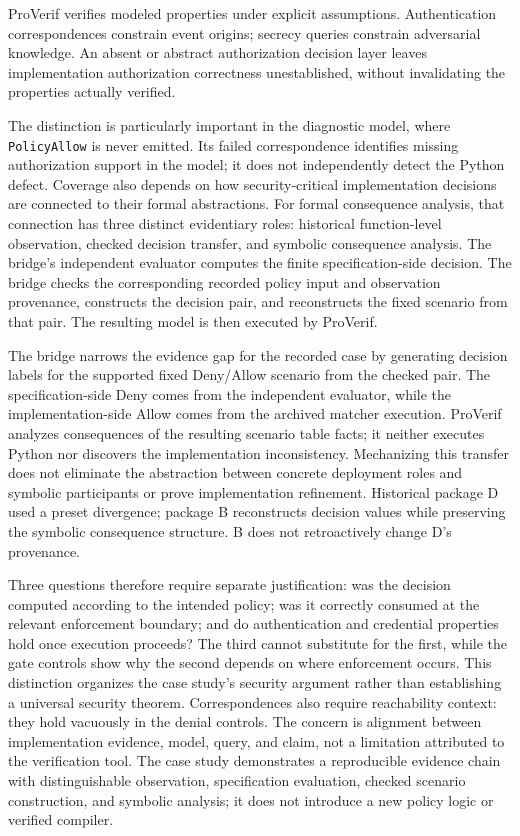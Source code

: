 ProVerif verifies modeled properties under explicit assumptions.
Authentication correspondences constrain event origins; secrecy queries
constrain adversarial knowledge. An absent or abstract authorization decision
layer leaves implementation authorization correctness unestablished, without
invalidating the properties actually verified.

The distinction is particularly important in the diagnostic model, where
\texttt{PolicyAllow} is never emitted. Its failed correspondence identifies
missing authorization support in the model; it does not independently detect
the Python defect. Coverage also depends on how security-critical
implementation decisions are connected to their formal abstractions.
For formal consequence analysis, that connection has three distinct evidentiary roles:
historical function-level observation, checked decision transfer, and
symbolic consequence analysis. The bridge's independent evaluator computes
the finite specification-side decision. The bridge checks the corresponding
recorded policy input and observation provenance, constructs the decision
pair, and reconstructs the fixed scenario from that pair. The resulting model is then
executed by ProVerif.

The bridge narrows the evidence gap for the recorded case by generating
decision labels for the supported fixed Deny/Allow scenario from the checked
pair. The specification-side Deny comes from the
independent evaluator, while the implementation-side Allow comes from the
archived matcher execution. ProVerif analyzes consequences of the resulting
scenario table facts; it neither executes Python nor discovers the implementation
inconsistency. Mechanizing this transfer does not eliminate the abstraction
between concrete deployment roles and symbolic participants or prove
implementation refinement. Historical package D used a preset divergence;
package B reconstructs decision values while preserving the symbolic
consequence structure. B does not retroactively change D's provenance.

Three questions therefore require separate justification: was the decision
computed according to the intended policy; was it correctly consumed at the
relevant enforcement boundary; and do authentication and credential
properties hold once execution proceeds? The third cannot substitute for
the first, while the gate controls show why the second depends on where
enforcement occurs. This distinction organizes the case study's security
argument rather than establishing a universal security theorem.
Correspondences also require
reachability context: they hold vacuously in the denial controls. The concern
is alignment between implementation evidence, model, query, and claim,
not a limitation attributed to the verification tool. The case study
demonstrates a reproducible evidence chain with distinguishable observation,
specification evaluation, checked scenario construction, and symbolic
analysis; it does not introduce a new policy logic or verified compiler.

